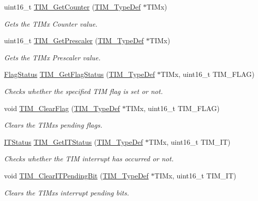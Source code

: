\begin{DoxyCompactItemize}
uint16\+\_\+t \mbox{\hyperlink{group___t_i_m___private___functions_gab6826b144ae70e206f51ae8af5318a93}{T\+I\+M\+\_\+\+Get\+Counter}} (\mbox{\hyperlink{struct_t_i_m___type_def}{T\+I\+M\+\_\+\+Type\+Def}} $\ast$T\+I\+Mx)
\begin{DoxyCompactList}\small\item\em Gets the T\+I\+Mx Counter value. \end{DoxyCompactList}\item 
uint16\+\_\+t \mbox{\hyperlink{group___t_i_m___private___functions_ga427eb6e533480e02a27cd0ca876183d6}{T\+I\+M\+\_\+\+Get\+Prescaler}} (\mbox{\hyperlink{struct_t_i_m___type_def}{T\+I\+M\+\_\+\+Type\+Def}} $\ast$T\+I\+Mx)
\begin{DoxyCompactList}\small\item\em Gets the T\+I\+Mx Prescaler value. \end{DoxyCompactList}\item 
\mbox{\hyperlink{group___exported__types_ga89136caac2e14c55151f527ac02daaff}{Flag\+Status}} \mbox{\hyperlink{group___t_i_m___private___functions_ga0adcbbd5e838ec8642e7a9b80075f41f}{T\+I\+M\+\_\+\+Get\+Flag\+Status}} (\mbox{\hyperlink{struct_t_i_m___type_def}{T\+I\+M\+\_\+\+Type\+Def}} $\ast$T\+I\+Mx, uint16\+\_\+t T\+I\+M\+\_\+\+F\+L\+AG)
\begin{DoxyCompactList}\small\item\em Checks whether the specified T\+IM flag is set or not. \end{DoxyCompactList}\item 
void \mbox{\hyperlink{group___t_i_m___private___functions_ga46568c7b254941dc53e785342d60baf3}{T\+I\+M\+\_\+\+Clear\+Flag}} (\mbox{\hyperlink{struct_t_i_m___type_def}{T\+I\+M\+\_\+\+Type\+Def}} $\ast$T\+I\+Mx, uint16\+\_\+t T\+I\+M\+\_\+\+F\+L\+AG)
\begin{DoxyCompactList}\small\item\em Clears the T\+I\+Mx\textquotesingle{}s pending flags. \end{DoxyCompactList}\item 
\mbox{\hyperlink{group___exported__types_gaacbd7ed539db0aacd973a0f6eca34074}{I\+T\+Status}} \mbox{\hyperlink{group___t_i_m___private___functions_ga0827a0b411707304f76d33050727c24d}{T\+I\+M\+\_\+\+Get\+I\+T\+Status}} (\mbox{\hyperlink{struct_t_i_m___type_def}{T\+I\+M\+\_\+\+Type\+Def}} $\ast$T\+I\+Mx, uint16\+\_\+t T\+I\+M\+\_\+\+IT)
\begin{DoxyCompactList}\small\item\em Checks whether the T\+IM interrupt has occurred or not. \end{DoxyCompactList}\item 
void \mbox{\hyperlink{group___t_i_m___private___functions_ga9eb1e95af71ed380f51a2c6d585cc5d6}{T\+I\+M\+\_\+\+Clear\+I\+T\+Pending\+Bit}} (\mbox{\hyperlink{struct_t_i_m___type_def}{T\+I\+M\+\_\+\+Type\+Def}} $\ast$T\+I\+Mx, uint16\+\_\+t T\+I\+M\+\_\+\+IT)
\begin{DoxyCompactList}\small\item\em Clears the T\+I\+Mx\textquotesingle{}s interrupt pending bits. \end{DoxyCompactList}\end{DoxyCompactItemize}


